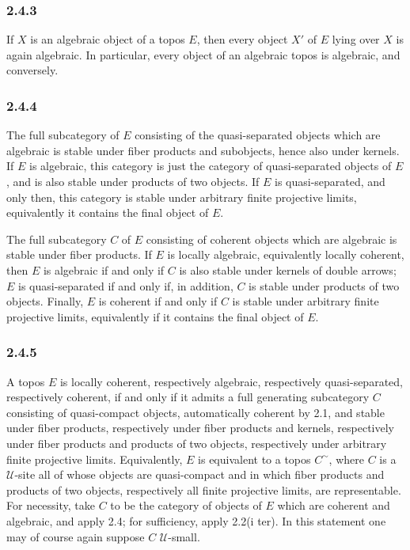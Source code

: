 \documentclass[11pt]{article}
\newcommand{\U}{\mathcal{U}}
\begin{document}
\subsubsection*{2.4.3}
If \(X\) is an algebraic object of a topos \(E\), then every object \(X'\) of \(E\) lying over \(X\) is again algebraic. In particular, every object of an algebraic topos is algebraic, and conversely.

\subsubsection*{2.4.4}
The full subcategory of \(E\) consisting of the quasi-separated objects which are algebraic is stable under fiber products and subobjects, hence also under kernels. If \(E\) is algebraic, this category is just the category of quasi-separated objects of \(E\), and is also stable under products of two objects. If \(E\) is quasi-separated, and only then, this category is stable under arbitrary finite projective limits, equivalently it contains the final object of \(E\).

The full subcategory \(C\) of \(E\) consisting of coherent objects which are algebraic is stable under fiber products. If \(E\) is locally algebraic, equivalently locally coherent, then \(E\) is algebraic if and only if \(C\) is also stable under kernels of double arrows; \(E\) is quasi-separated if and only if, in addition, \(C\) is stable under products of two objects. Finally, \(E\) is coherent if and only if \(C\) is stable under arbitrary finite projective limits, equivalently if it contains the final object of \(E\).

\subsubsection*{2.4.5}
A topos \(E\) is locally coherent, respectively algebraic, respectively quasi-separated, respectively coherent, if and only if it admits a full generating subcategory \(C\) consisting of quasi-compact objects, automatically coherent by 2.1, and stable under fiber products, respectively under fiber products and kernels, respectively under fiber products and products of two objects, respectively under arbitrary finite projective limits. Equivalently, \(E\) is equivalent to a topos \(C^\sim\), where \(C\) is a \(\U\)-site all of whose objects are quasi-compact and in which fiber products and products of two objects, respectively all finite projective limits, are representable. For necessity, take \(C\) to be the category of objects of \(E\) which are coherent and algebraic, and apply 2.4; for sufficiency, apply 2.2(i ter). In this statement one may of course again suppose \(C\) \(\U\)-small.
\end{document}
